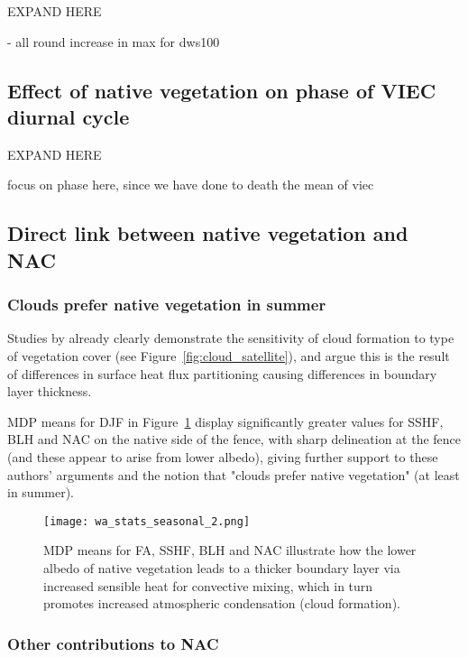 EXPAND HERE

- all round increase in max for dws100

\subsection{Effect of native vegetation on phase of VIEC diurnal cycle}

EXPAND HERE

focus on phase here, since we have done to death the mean of viec

\subsection{Direct link between native vegetation and NAC}
\label{ssec:native_nac}

\subsubsection{Clouds prefer native vegetation in summer}

Studies by \citet{lyons1993, lyons1996, lyons2002, ray2003, nair2011} already clearly demonstrate the sensitivity of cloud formation to type of vegetation cover (see Figure~\ref{fig:cloud_satellite}), and argue this is the result of differences in surface heat flux partitioning causing differences in boundary layer thickness.

\ac{MDP} means for \ac{DJF} in Figure~\ref{fig:wa_stats_seasonal_2} display significantly greater values for \ac{SSHF}, \ac{BLH} and \ac{NAC} on the native side of the fence, with sharp delineation at the fence (and these appear to arise from lower albedo), giving further support to these authors' arguments and the notion that "clouds prefer native vegetation" \citep{lyons2002} (at least in summer).

\begin{figure}[!htp]
	\centering
	\texttt{[image: wa\_stats\_seasonal\_2.png]}
	\caption[Selected MDP means with fence delineations]{\acs{MDP} means for \acs{FA}, \acs{SSHF}, \acs{BLH} and \acs{NAC} illustrate how the lower albedo of native vegetation leads to a thicker boundary layer via increased sensible heat for convective mixing, which in turn promotes increased atmospheric condensation (cloud formation).}
	\label{fig:wa_stats_seasonal_2}
\end{figure}

\subsubsection{Other contributions to NAC}

